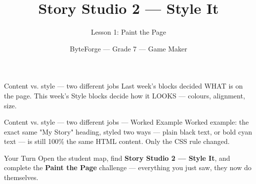 \documentclass[aspectratio=169]{beamer}
\title{Story Studio 2 — Style It}
\subtitle{Lesson 1: Paint the Page}
\author{ByteForge --- Grade 7 --- Game Maker}
\date{}
\begin{document}
\begin{frame}
    \titlepage
\end{frame}

\begin{frame}{Content vs. style — two different jobs}
    \Large
    Last week's blocks decided WHAT is on the page. This week's Style blocks decide how it LOOKS — colours, alignment, size.

    \begin{center}
    \end{center}
\end{frame}

\begin{frame}{Content vs. style — two different jobs --- Worked Example}
    \Large
    Worked example: the exact same "My Story" heading, styled two ways — plain black text, or bold cyan text — is still 100\% the same HTML content. Only the CSS rule changed.
\end{frame}

\begin{frame}{Your Turn}
    \Large
    Open the student map, find \textbf{Story Studio 2 — Style It}, and complete
    the \textbf{Paint the Page} challenge --- everything you just saw, they now do themselves.
\end{frame}
\end{document}
